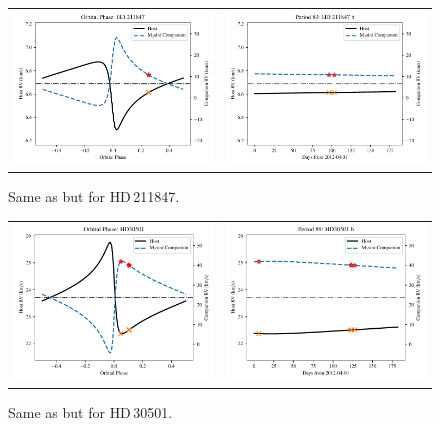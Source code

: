 \begin{figure}
    \centering
    \begin{tabular}{cc}
        \includegraphics[width=0.45\linewidth]{figures/direct-recovery/orbital-plots/HD211847_orbital_phase.pdf}&
        \includegraphics[width=0.45\linewidth]{figures/direct-recovery/orbital-plots/HD211847_p89.pdf}\\
    \end{tabular}
    \caption{Same as  but for {HD\,211847}.}
    \label{fig:hd211847p89}
\end{figure}

\begin{figure}
    \centering
    \begin{tabular}{cc}
        \includegraphics[width=0.45\linewidth]{figures/direct-recovery/orbital-plots/HD30501_orbital_phase.pdf}&
        \includegraphics[width=0.45\linewidth]{figures/direct-recovery/orbital-plots/HD30501_p89.pdf}\\
    \end{tabular}
    \caption{Same as  but for {HD\,30501}.}
    \label{fig:hd30501p89}
\end{figure}




